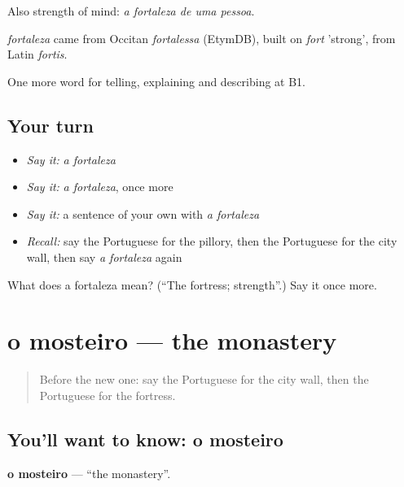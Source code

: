 Also strength of mind: \emph{a fortaleza de uma pessoa}.

\begin{cousinweb}
\emph{fortaleza} came from Occitan \emph{fortalessa} (EtymDB), built on \emph{fort} 'strong', from Latin \emph{fortis}.
\end{cousinweb}

\begin{grammarlens}[title={What you've built}]
One more word for telling, explaining and describing at B1.
\end{grammarlens}

\subsection*{Your turn}
\begin{itemize}
\raggedright
  \item \emph{Say it:} \emph{a fortaleza}
  \item \emph{Say it:} \emph{a fortaleza}, once more
  \item \emph{Say it:} a sentence of your own with \emph{a fortaleza}
  \item \emph{Recall:} say the Portuguese for the pillory, then the Portuguese for the city wall, then say \emph{a fortaleza} again
\end{itemize}

\begin{tcolorbox}[breakable,colback=teal!4,colframe=teal!35!black,title={Before you move on}]
What does a fortaleza mean? (\textquotedblleft{}The fortress; strength\textquotedblright{}.) Say it once more.
\end{tcolorbox}
\section[o mosteiro]{o mosteiro — the monastery}

\label{lesson:PT-C442-mosteiro}



\begin{quote}
Before the new one: say the Portuguese for the city wall, then the Portuguese for the fortress.
\end{quote}

\subsection*{You'll want to know: o mosteiro}
\textbf{o mosteiro} — \textquotedblleft{}the monastery\textquotedblright{}.

